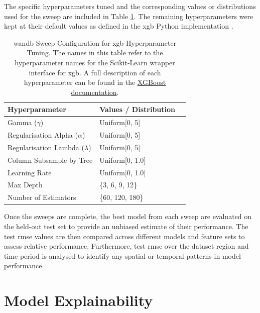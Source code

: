 The specific hyperparameters tuned and the corresponding values or distributions used for the sweep are included in Table \ref{tab:wandb-sweep-config}. The remaining hyperparameters were kept at their default values as defined in the \acrshort{xgb} Python implementation .

\begin{table}[!ht]
    \centering
    \caption{\acrshort{wandb} Sweep Configuration for \acrshort{xgb} Hyperparameter Tuning. The names in this table refer to the hyperparameter names for the Scikit-Learn wrapper interface for \acrshort{xgb}. A full description of each hyperparameter can be found in the \href{https://xgboost.readthedocs.io/en/stable/python/python_api.html\#module-xgboost.sklearn}{XGBoost documentation}.}
    \label{tab:wandb-sweep-config}
    \begin{tabular}{llr}     
        \toprule
        \textbf{Hyperparameter} & \textbf{Values / Distribution} \\ 
        \midrule
        Gamma ($\gamma$) & Uniform[0, 5] \\
        Regularisation Alpha ($\alpha$) & Uniform[0, 5] \\
        Regularisation Lambda ($\lambda$) & Uniform[0, 5] \\
        Column Subsample by Tree & Uniform[0, 1.0] \\
        Learning Rate & Uniform[0, 1.0] \\
        Max Depth & \{3, 6, 9, 12\} \\
        Number of Estimators & \{60, 120, 180\} \\
        \bottomrule
    \end{tabular}
\end{table}

Once the sweeps are complete, the best model from each sweep are evaluated on the held-out test set to provide an unbiased estimate of their performance. The test \acrshort{rmse} values are then compared across different models and feature sets to assess relative performance. Furthermore, test \acrshort{rmse} over the dataset region and time period is analysed to identify any spatial or temporal patterns in model performance. 

\section{Model Explainability}

